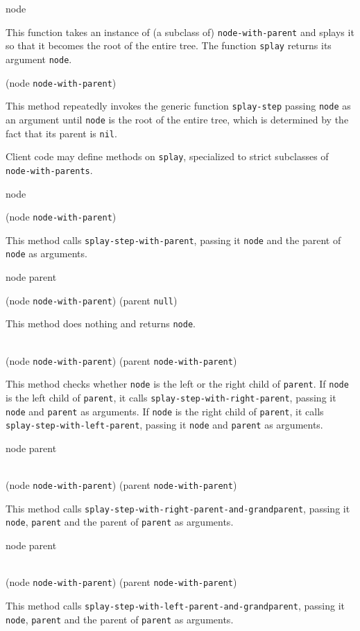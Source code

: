  {node}

This function takes an instance of (a subclass of)
\texttt{node-with-parent} and splays it so that it becomes the root of
the entire tree.  The function \texttt{splay} returns its argument
\texttt{node}.

 {(node \texttt{node-with-parent})}

This method repeatedly invokes the generic function
\texttt{splay-step} passing \texttt{node} as an argument until
\texttt{node} is the root of the entire tree, which is determined by
the fact that its parent is \texttt{nil}.

Client code may define methods on \texttt{splay}, specialized to
strict subclasses of \texttt{node-with-parents}.

 {node}

 {(node \texttt{node-with-parent})}

This method calls \texttt{splay-step-with-parent}, passing it
\texttt{node} and the parent of \texttt{node} as arguments.

 {node parent}

{(node \texttt{node-with-parent}) (parent \texttt{null})}

This method does nothing and returns \texttt{node}.

\\
{(node \texttt{node-with-parent}) (parent \texttt{node-with-parent})}

This method checks whether \texttt{node} is the left or the right child
of \texttt{parent}.  If \texttt{node} is the left child of
\texttt{parent}, it calls \texttt{splay-step-with-right-parent},
passing it \texttt{node} and \texttt{parent} as arguments.  If
\texttt{node} is the right child of \texttt{parent}, it calls
\texttt{splay-step-with-left-parent}, passing it \texttt{node} and
\texttt{parent} as arguments.

 {node parent}

\\
{(node \texttt{node-with-parent}) (parent \texttt{node-with-parent})}

This method calls \texttt{splay-step-with-right-parent-and-grandparent},
passing it \texttt{node}, \texttt{parent} and the parent of
\texttt{parent} as arguments.

 {node parent}

\\
{(node \texttt{node-with-parent}) (parent \texttt{node-with-parent})}

This method calls \texttt{splay-step-with-left-parent-and-grandparent},
passing it \texttt{node}, \texttt{parent} and the parent of
\texttt{parent} as arguments.
